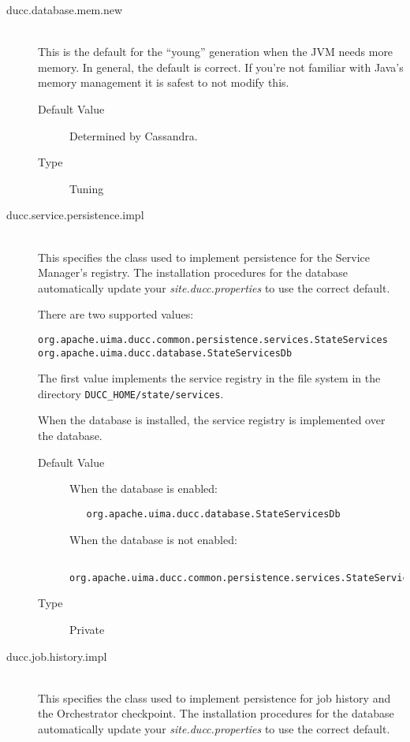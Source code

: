 \begin{description}
      \item[ducc.database.mem.new] \hfill \\
        This is the default for the ``young'' generation when the JVM needs more memory.
        In general, the default is correct.  If you're not familiar with Java's memory
        management it is safest to not modify this.
        \begin{description}
          \item[Default Value] Determined by Cassandra.
          \item[Type] Tuning
        \end{description} 

      \item[ducc.service.persistence.impl] \hfill \\
        This specifies the class used to implement persistence for the Service Manager's registry.  
        The installation procedures for the database automatically update your {\em site.ducc.properties}
        to use the correct default.

        There
        are two supported values:
\begin{verbatim}
org.apache.uima.ducc.common.persistence.services.StateServices
org.apache.uima.ducc.database.StateServicesDb
\end{verbatim}

        The first value implements the service registry in the file system in the directory
        {\tt DUCC\_HOME/state/services}.

        When the database is installed, the service registry is implemented over the database.

        \begin{description}
          \item[Default Value] When the database is enabled:
\begin{verbatim}
   org.apache.uima.ducc.database.StateServicesDb
\end{verbatim}

            When the database is not enabled:
\begin{verbatim}
   org.apache.uima.ducc.common.persistence.services.StateServices
\end{verbatim}
          \item[Type] Private
        \end{description} 


      \item[ducc.job.history.impl] \hfill \\
        This specifies the class used to implement persistence for job history and the 
        Orchestrator checkpoint.  
        The installation procedures for the database automatically update your {\em site.ducc.properties}
        to use the correct default.


\end{description}
